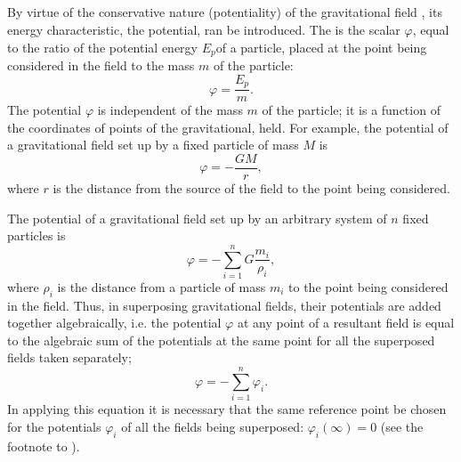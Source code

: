 \subsection{}\label{6.2.4} By virtue of the conservative nature (potentiality) of the gravitational field , its energy characteristic, the potential, ran be introduced. The  is the scalar $\varphi$, equal to the ratio of the potential energy $E_{p}$of a par­ticle, placed at the point being considered in the field to the mass $m$ of the particle:
\begin{equation*}%
\varphi = \frac{E_{p}}{m}.
\end{equation*}
The potential $\varphi$ is independent of the mass $m$ of the particle; it is a function of the coordinates of points of the gravitational, held. For example, the potential of a gravitational field set up by a fixed particle of mass $M$ is
\begin{equation*}%
\varphi = - \frac{GM}{r},
\end{equation*}
where $r$ is the distance from the source of the field to the point being considered.

The potential of a gravitational field set up by an arbitrary system of $n$ fixed particles is
\begin{equation*}%
\varphi = - \sum_{i=1}^{n}G \frac{m_{i}}{\rho_{i}},
\end{equation*}
where $\rho_{i}$ is the distance from a particle of mass $m_{i}$ to the point being considered in the field. Thus, in superposing gravitational fields, their potentials are added together algebraically, i.e. the potential $\varphi$ at any point of a resultant field is equal to the algebraic sum of the potentials at the same point for all the superposed fields taken separately;
\begin{equation*}%
\varphi = - \sum_{i=1}^{n} \varphi_{i}.
\end{equation*}
 In applying this equation it is necessary that the same reference point be chosen for the potentials $\varphi_{i}$ of all the fields being superposed: $\varphi_{i}(\infty)=0$ (see the footnote to ). 

